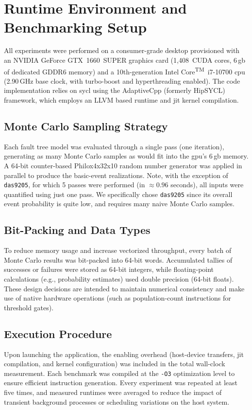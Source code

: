 \section{Runtime Environment and Benchmarking Setup}
\label{subsec:runtime_environment}

All experiments were performed on a consumer-grade desktop provisioned with an NVIDIA\textsuperscript{\textregistered} GeForce GTX~1660~SUPER graphics card (1{,}408~CUDA cores, 6\,\acrshort{gb} of dedicated GDDR6 memory) and a 10th-generation Intel\textsuperscript{\textregistered} Core\textsuperscript{TM}~i7-10700 \acrshort{cpu} (2.90\,GHz base clock, with turbo-boost and hyperthreading enabled). The code implementation relies on \acrshort{sycl} using the AdaptiveCpp (formerly HipSYCL) framework, which employs an LLVM based runtime and \acrfull{jit} kernel compilation.

\subsection*{Monte Carlo Sampling Strategy}
Each fault tree model was evaluated through a single pass (one iteration), generating as many Monte Carlo samples as would fit into the \acrshort{gpu}'s 6\,\acrshort{gb} memory. A 64-bit counter-based Philox4x32x10 random number generator was applied in parallel to produce the basic-event realizations. Note, with the exception of \texttt{das9205}, for which 5 passes were performed (in $\approx 0.96$ seconds), all inputs were quantified using just one pass. We specifically chose \texttt{das9205} since its overall event probability is quite low, and requires many naive Monte Carlo samples.

\subsection*{Bit-Packing and Data Types}
To reduce memory usage and increase vectorized throughput, every batch of Monte Carlo results was bit-packed into 64-bit words. Accumulated tallies of successes or failures were stored as 64-bit integers, while floating-point calculations (e.g., probability estimates) used double precision (64-bit floats). These design decisions are intended to maintain numerical consistency and make use of native hardware operations (such as population-count instructions for threshold gates).

\subsection*{Execution Procedure}
Upon launching the application, the enabling overhead (host-device transfers, \acrshort{jit} compilation, and kernel configuration) was included in the total wall-clock measurement. Each benchmark was compiled at the \texttt{-O3} optimization level to ensure efficient instruction generation. Every experiment was repeated at least five times, and measured runtimes were averaged to reduce the impact of transient background processes or scheduling variations on the host system.

